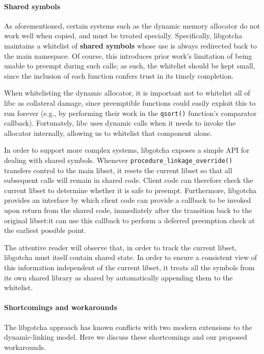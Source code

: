 \paragraph{Shared symbols}

As aforementioned, certain systems such as the dynamic memory allocator do not work
well when copied, and must be treated specially.  Specifically, libgotcha maintains
a whitelist of \textbf{shared symbols} whose use is always redirected back to the
main namespace.  Of course, this introduces prior work's limitation of being unable
to preempt during such calls; as such, the whitelist should be kept small, since the
inclusion of each function confers trust in its timely completion.

When whitelisting the dynamic allocator, it is important not to whitelist all of libc
as collateral damage,
since preemptible functions could easily exploit this to run forever (e.g., by
performing their work in the \texttt{qsort()} function's comparator callback).
Fortunately, libc uses dynamic calls when it needs to invoke the allocator
internally, allowing us to whitelist that component alone.

In order to support more complex systems, libgotcha exposes a simple API for dealing
with shared symbols.  Whenever \texttt{procedure\_linkage\_override()} transfers
control to the main libset, it resets the current libset so that all subsequent calls
will remain in shared code.  Client code can therefore check the current libset to
determine
whether it is safe to preempt.  Furthermore, libgotcha provides an interface by which
client code can provide a callback to be invoked upon return from the shared code,
immediately after the transition back to the original libset:\@ it can use this
callback to perform a deferred preemption check at the earliest possible point.

The attentive reader will observe that, in order to track the current libset,
libgotcha must itself contain shared state.  In order to ensure a consistent view of
this information independent of the current libset, it treats all the symbols from
its own shared library as shared by automatically appending them to the whitelist.

\paragraph{Shortcomings and workarounds}

The libgotcha approach has known conflicts with two modern extensions to the
dynamic-linking model.  Here we discuss these shortcomings and our proposed
workarounds.

